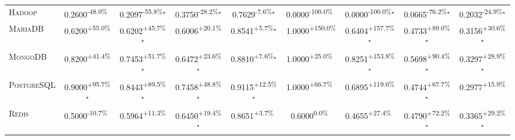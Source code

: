 \begin{table}[htbp]
\begin{tabular}{l|cccc|cccc}
\textsc{Hadoop} & \cellcolor{red!30}0.2600\textsuperscript{-48.0\%}$^{\,\,\,}$ & \cellcolor{red!30}0.2097\textsuperscript{-55.8\%}$^\star$ & \cellcolor{red!30}0.3750\textsuperscript{-28.2\%}$^\star$ & \cellcolor{red!30}0.7629\textsuperscript{-7.6\%}$^\star$ & \cellcolor{red!30}0.0000\textsuperscript{-100.0\%}$^{\,\,\,}$ & \cellcolor{red!30}0.0000\textsuperscript{-100.0\%}$^\star$ & \cellcolor{red!30}0.0665\textsuperscript{-76.2\%}$^\star$ & \cellcolor{red!30}0.2032\textsuperscript{-24.9\%}$^\star$ \\
\textsc{MariaDB} & \cellcolor{green!30}0.6200\textsuperscript{+55.0\%}$^{\,\,\,}$ & \cellcolor{green!30}0.6202\textsuperscript{+45.7\%}$^\star$ & \cellcolor{green!30}0.6006\textsuperscript{+20.1\%}$^{\,\,\,}$ & \cellcolor{green!30}0.8541\textsuperscript{+5.7\%}$^\star$ & \cellcolor{green!30}1.0000\textsuperscript{+150.0\%}$^{\,\,\,}$ & \cellcolor{green!30}0.6404\textsuperscript{+157.7\%}$^\star$ & \cellcolor{green!30}0.4733\textsuperscript{+89.0\%}$^\star$ & \cellcolor{green!30}0.3156\textsuperscript{+30.6\%}$^\star$ \\
\textsc{MongoDB} & \cellcolor{green!30}0.8200\textsuperscript{+41.4\%}$^{\,\,\,}$ & \cellcolor{green!30}0.7453\textsuperscript{+51.7\%}$^\star$ & \cellcolor{green!30}0.6472\textsuperscript{+23.6\%}$^\star$ & \cellcolor{green!30}0.8810\textsuperscript{+7.6\%}$^\star$ & \cellcolor{green!30}1.0000\textsuperscript{+25.0\%}$^{\,\,\,}$ & \cellcolor{green!30}0.8251\textsuperscript{+153.8\%}$^\star$ & \cellcolor{green!30}0.5698\textsuperscript{+90.4\%}$^\star$ & \cellcolor{green!30}0.3297\textsuperscript{+28.9\%}$^\star$ \\
\textsc{PostgreSQL} & \cellcolor{green!30}0.9000\textsuperscript{+95.7\%}$^\star$ & \cellcolor{green!30}0.8443\textsuperscript{+89.5\%}$^\star$ & \cellcolor{green!30}0.7458\textsuperscript{+48.8\%}$^\star$ & \cellcolor{green!30}0.9115\textsuperscript{+12.5\%}$^\star$ & \cellcolor{green!30}1.0000\textsuperscript{+66.7\%}$^{\,\,\,}$ & \cellcolor{green!30}0.6895\textsuperscript{+119.6\%}$^{\,\,\,}$ & \cellcolor{green!30}0.4744\textsuperscript{+67.7\%}$^\star$ & \cellcolor{green!30}0.2977\textsuperscript{+15.9\%}$^{\,\,\,}$ \\
\textsc{Redis} & \cellcolor{red!30}0.5000\textsuperscript{-10.7\%}$^{\,\,\,}$ & \cellcolor{green!30}0.5964\textsuperscript{+11.3\%}$^{\,\,\,}$ & \cellcolor{green!30}0.6450\textsuperscript{+19.4\%}$^\star$ & \cellcolor{green!30}0.8651\textsuperscript{+3.7\%}$^{\,\,\,}$ & \cellcolor{red!30}0.6000\textsuperscript{0.0\%}$^{\,\,\,}$ & \cellcolor{green!30}0.4655\textsuperscript{+27.4\%}$^{\,\,\,}$ & \cellcolor{green!30}0.4790\textsuperscript{+72.2\%}$^\star$ & \cellcolor{green!30}0.3365\textsuperscript{+29.2\%}$^\star$ \\

\end{tabular}
\end{table}
